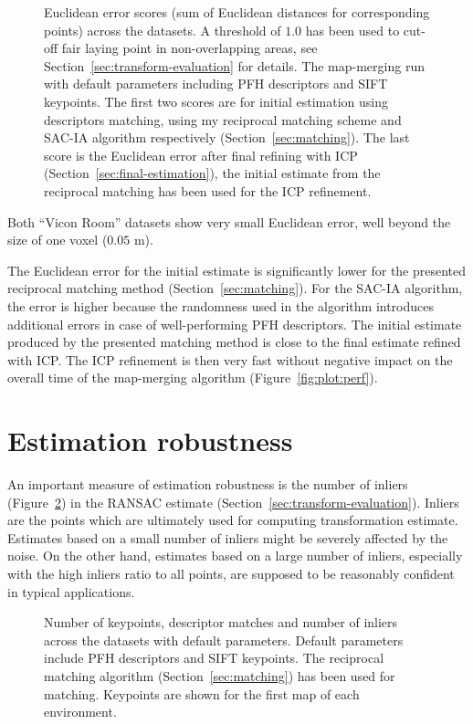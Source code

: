\begin{figure}
  \centering
  
  \caption[Euclidean error scores for aerial datasets]{Euclidean error scores (sum of Euclidean distances for corresponding points) across the datasets. A threshold of $1.0$ has been used to cut-off fair laying point in non-overlapping areas, see Section~\ref{sec:transform-evaluation} for details. The map-merging run with default parameters including \gls{PFH} descriptors and \gls{SIFT} keypoints. The first two scores are for initial estimation using descriptors matching, using my reciprocal matching scheme and \gls{SAC-IA} algorithm respectively (Section~\ref{sec:matching}). The last score is the Euclidean error after final refining with \gls{ICP} (Section~\ref{sec:final-estimation}), the initial estimate from the reciprocal matching has been used for the \gls{ICP} refinement.}
  \label{fig:plot:euc_dist}
\end{figure}

Both ``Vicon Room'' datasets show very small Euclidean error, well beyond the size of one voxel ($0.05$ m).

The Euclidean error for the initial estimate is significantly lower for the presented reciprocal matching method (Section~\ref{sec:matching}). For the \gls{SAC-IA} algorithm, the error is higher because the randomness used in the algorithm introduces additional errors in case of well-performing \gls{PFH} descriptors. The initial estimate produced by the presented matching method is close to the final estimate refined with \gls{ICP}. The \gls{ICP} refinement is then very fast without negative impact on the overall time of the map-merging algorithm (Figure~\ref{fig:plot:perf}).

\section{Estimation robustness}

An important measure of estimation robustness is the number of inliers (Figure~\ref{fig:plot:inliers}) in the \gls{RANSAC} estimate (Section~\ref{sec:transform-evaluation}). Inliers are the points which are ultimately used for computing transformation estimate. Estimates based on a small number of inliers might be severely affected by the noise. On the other hand, estimates based on a large number of inliers, especially with the high inliers ratio to all points, are supposed to be reasonably confident in typical applications.

\begin{figure}
  \centering
  
  \caption[Number of keypoints, matches and inliers for aerial datasets]{Number of keypoints, descriptor matches and number of inliers across the datasets with default parameters. Default parameters include \gls{PFH} descriptors and \gls{SIFT} keypoints. The reciprocal matching algorithm (Section~\ref{sec:matching}) has been used for matching. Keypoints are shown for the first map of each environment.}
  \label{fig:plot:inliers}
\end{figure}

